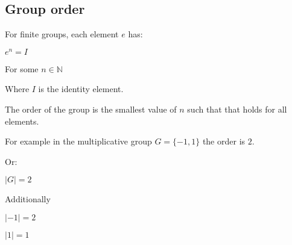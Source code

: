 
\subsection{Group order}

For finite groups, each element \(e\) has:

\(e^n=I\)

For some \(n\in \mathbb{N}\)

Where \(I\) is the identity element.

The order of the group is the smallest value of \(n\) such that that holds for all elements.

For example in the multiplicative group \(G=\{-1,1\}\) the order is \(2\).

Or:

\(|G|=2\)

Additionally

\(|-1|=2\)

\(|1|=1\)

